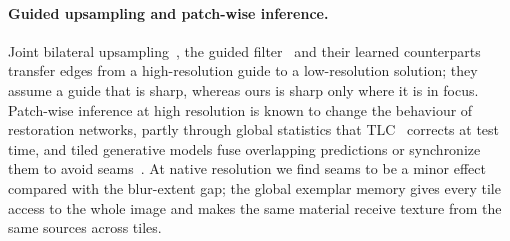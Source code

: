 \paragraph{Guided upsampling and patch-wise inference.}
Joint bilateral upsampling~\cite{kopf2007jbu}, the guided filter~\cite{he2013guided} and their learned
counterparts~\cite{wu2018deepguided,gharbi2017hdrnet} transfer edges from a high-resolution guide to a
low-resolution solution; they assume a guide that is sharp, whereas ours is sharp only where it is in
focus. Patch-wise inference at high resolution is known to change the behaviour of restoration
networks, partly through global statistics that TLC~\cite{chu2022tlc} corrects at test time, and
tiled generative models fuse overlapping predictions or synchronize them to avoid
seams~\cite{bartal2023multidiffusion,lee2023syncdiffusion,du2024demofusion}. At native resolution we
find seams to be a minor effect compared with the blur-extent gap; the global exemplar memory gives
every tile access to the whole image and makes the same material receive texture from the same
sources across tiles.
